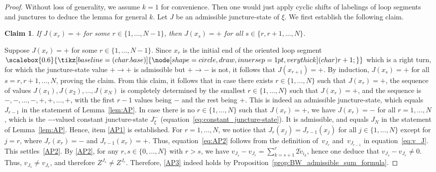 \documentclass[10pt,a4paper]{amsart}
\numberwithin{equation}{section}
\newtheorem*{Claim*}{Claim}
\theoremstyle{definition}
\newcommand*\circlee[1]{\scalebox{0.6}{\tikz[baseline=(char.base)]{
 \node[shape=circle,draw,inner sep=1pt,very thick] (char) {#1};}}}
\newcommand{\til}[1]{\widetilde{#1}}
\begin{document}
\begin{proof} Without loss of generality, we assume $k=1$ for convenience. Then one would just apply cyclic shifts of labelings of loop segments and junctures to deduce the lemma for general $k$.
Let $J$ be an admissible juncture-state of $\xi$. We first establish the following claim.
\begin{Claim*} If $J(x_r)=+$ for some $r \in \{1,\dots,N-1\}$, then $J(x_s)=+$ for all $s \in \{r,r+1,\dots,N\}$.
\end{Claim*}
Suppose $J(x_r)=+$ for some $r \in \{1,\dots,N-1\}$. Since $x_r$ is the initial end of the oriented loop segment $\circlee{r+1}$ which is a right turn, for which the juncture-state value $+ \to +$ is admissible but $+ \to -$ is not, it follows that $J(x_{r+1})=+$. By induction, $J(x_s)=+$ for all $s = r,r+1,\dots,N$, proving the claim.
From this claim, it follows that in case there exists $r\in \{1,\dots,N\}$ such that $J(x_r)=+$, the sequence of values $J(x_1), J(x_2),\dots,J(x_N)$ is completely determined by the smallest $r \in \{1,\dots,N\}$ such that $J(x_r)=+$, and the sequence is $-,-,\dots,-,+,+,\dots,+$, with the first $r-1$ values being $-$ and the rest being $+$. This is indeed an admissible juncture-state, which equals $J_{r-1}$ in the statement of Lemma~\ref{lem:AP}.
In case there is no $r\in \{1,\dots,N\}$ such that $J(x_r)=+$, we have $J(x_r)=-$ for all $r=1,\dots,N$, which is the $-$-valued constant juncture-state $J_\xi^-$ (equation~\eqref{eq:constant_juncture-state}). It is admissible, and equals $J_N$ in the statement of Lemma~\ref{lem:AP}. Hence, item \ref{AP1} is established.
For $r=1,\dots,N$, we notice that $J_r(x_j) = J_{r-1}(x_j)$ for all $j\in\{1,\dots,N\}$ except for $j=r$, where $J_r(x_r)=-$ and $J_{r-1}(x_r)=+$. Thus, equation~\eqref{eq:AP2} follows from the definition of~$v_{J_r}$ and~$v_{J_{r-1}}$ in equation~\eqref{eq:v_J}. This settles~\ref{AP2}.
By \ref{AP2}, for any $r,s\in \{0,\dots,N\}$ with $r>s$, we have $v_{J_s} - v_{J_r} = \sum_{k=s+1}^r 2 \til{v}_{i_k}$, hence one deduce that $v_{J_s} - v_{J_r} \neq 0$. Thus, $v_{J_s} \neq v_{J_r}$, and therefore $Z^{J_s} \neq Z^{J_r}$. Therefore, \ref{AP3} indeed holds by Proposition~\ref{prop:BW_admissible_sum_formula}.
\end{proof}
\end{document}
